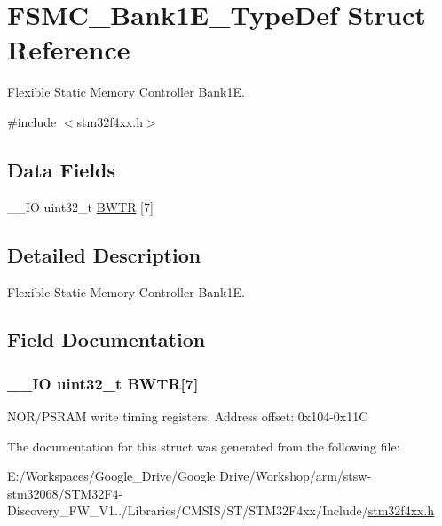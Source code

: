 \hypertarget{struct_f_s_m_c___bank1_e___type_def}{\section{F\-S\-M\-C\-\_\-\-Bank1\-E\-\_\-\-Type\-Def Struct Reference}
\label{struct_f_s_m_c___bank1_e___type_def}
}


Flexible Static Memory Controller Bank1\-E.  




{\ttfamily \#include $<$stm32f4xx.\-h$>$}

\subsection*{Data Fields}
\begin{DoxyCompactItemize}
\item 
\-\_\-\-\_\-\-I\-O uint32\-\_\-t \hyperlink{struct_f_s_m_c___bank1_e___type_def_a20f13b79c0f8670af319af0c5ebd5c91}{B\-W\-T\-R} \mbox{[}7\mbox{]}
\end{DoxyCompactItemize}


\subsection{Detailed Description}
Flexible Static Memory Controller Bank1\-E. 

\subsection{Field Documentation}
\hypertarget{struct_f_s_m_c___bank1_e___type_def_a20f13b79c0f8670af319af0c5ebd5c91}{
\subsubsection[{B\-W\-T\-R}]{\setlength{\rightskip}{0pt plus 5cm}\-\_\-\-\_\-\-I\-O uint32\-\_\-t B\-W\-T\-R\mbox{[}7\mbox{]}}}\label{struct_f_s_m_c___bank1_e___type_def_a20f13b79c0f8670af319af0c5ebd5c91}
N\-O\-R/\-P\-S\-R\-A\-M write timing registers, Address offset\-: 0x104-\/0x11\-C 

The documentation for this struct was generated from the following file\-:\begin{DoxyCompactItemize}
\item 
E\-:/\-Workspaces/\-Google\-\_\-\-Drive/\-Google Drive/\-Workshop/arm/stsw-\/stm32068/\-S\-T\-M32\-F4-\/\-Discovery\-\_\-\-F\-W\-\_\-\-V1../\-Libraries/\-C\-M\-S\-I\-S/\-S\-T/\-S\-T\-M32\-F4xx/\-Include/\hyperlink{stm32f4xx_8h}{stm32f4xx.\-h}\end{DoxyCompactItemize}
